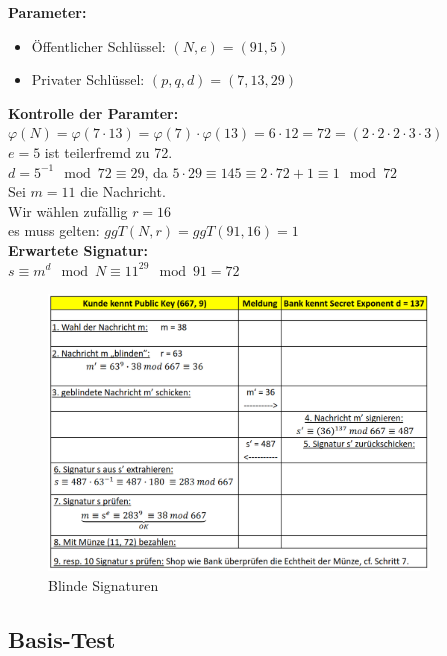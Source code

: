 \documentclass[12pt]{scrartcl}
\begin{document}
\textbf{Parameter:}
\begin{itemize}
    \item Öffentlicher Schlüssel: $(N,e) = (91, 5)$
    \item Privater Schlüssel: $(p,q,d) = (7,13,29)$
\end{itemize}

\textbf{Kontrolle der Paramter:}\\
$\varphi(N) = \varphi(7 \cdot 13) = \varphi(7) \cdot \varphi(13) = 6 \cdot 12 = 72 = (2 \cdot 2 \cdot 2 \cdot 3 \cdot 3)$\\
$e = 5$ ist teilerfremd zu 72.\\
$d = 5^{-1} \mod 72 \equiv 29$, da $5 \cdot 29 \equiv 145 \equiv 2 \cdot 72 + 1 \equiv 1 \mod 72$\\

Sei $m = 11$ die Nachricht.\\
Wir wählen zufällig $r = 16$\\
es muss gelten: $ggT(N,r) = ggT(91,16) = 1$\\

\textbf{Erwartete Signatur:}\\
$s \equiv m^d \mod N \equiv 11^{29} \mod 91 = 72$\\



\begin{figure}[ht]
    \centering
    \includegraphics[width=0.9\textwidth]{img/blinde_signatur.png}
    \caption{Blinde Signaturen}
    \label{fig:blinde_signaturen}
\end{figure}


\newpage
\subsection{Basis-Test}
\end{document}
